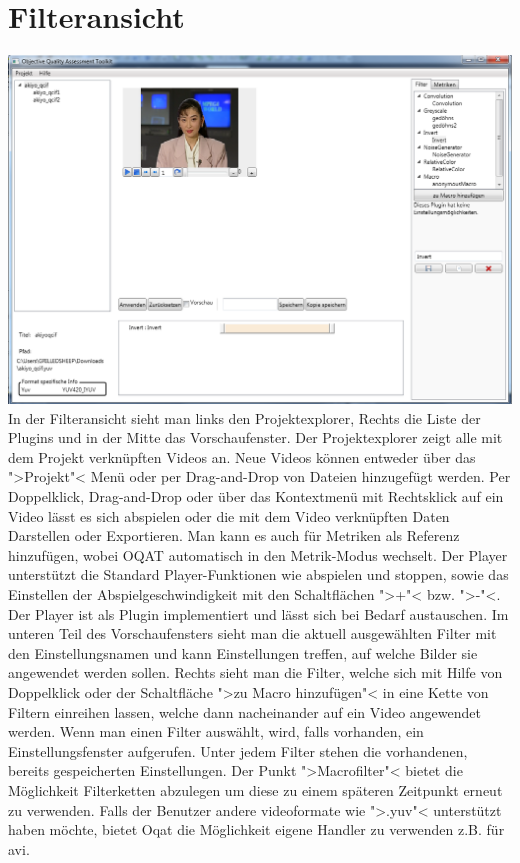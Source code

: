 \chapter{Filteransicht}
\includegraphics[scale=0.55]{bilder/Filter.png}\\[5ex]

In der Filteransicht sieht man links den Projektexplorer, Rechts die Liste der Plugins und in der Mitte das Vorschaufenster.
Der Projektexplorer zeigt alle mit dem Projekt verknüpften Videos an. Neue Videos können entweder über das ">Projekt"< Menü oder per Drag-and-Drop von Dateien hinzugefügt werden.
Per Doppelklick, Drag-and-Drop oder über das Kontextmenü mit Rechtsklick auf ein Video lässt es sich abspielen oder die mit dem Video verknüpften Daten Darstellen oder Exportieren. Man kann es auch für Metriken als Referenz hinzufügen, wobei OQAT automatisch in den Metrik-Modus wechselt.
Der Player unterstützt die Standard Player-Funktionen wie abspielen und stoppen, sowie das Einstellen der Abspielgeschwindigkeit mit den Schaltflächen ">+"< bzw. ">-"<. Der Player ist als Plugin implementiert und lässt sich bei Bedarf austauschen.
Im unteren Teil des Vorschaufensters sieht man die aktuell ausgewählten Filter mit den Einstellungsnamen und kann Einstellungen treffen, auf welche Bilder sie angewendet werden sollen. Rechts sieht man die Filter, welche sich mit Hilfe von Doppelklick oder der Schaltfläche ">zu Macro hinzufügen"< in eine Kette von Filtern einreihen lassen, welche dann nacheinander auf ein Video angewendet werden. Wenn man einen Filter auswählt, wird, falls vorhanden, ein Einstellungsfenster aufgerufen. Unter jedem Filter stehen die vorhandenen, bereits gespeicherten Einstellungen. Der Punkt ">Macrofilter"< bietet die Möglichkeit Filterketten abzulegen um diese zu einem späteren Zeitpunkt erneut zu verwenden. Falls der Benutzer andere videoformate wie ">.yuv"< unterstützt haben möchte, bietet Oqat die Möglichkeit eigene Handler zu verwenden z.B. für avi.


